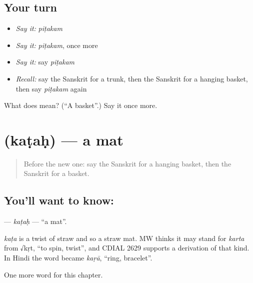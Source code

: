 \subsection*{Your turn}
\begin{itemize}
\raggedright
  \item \emph{Say it:} \emph{piṭakam}
  \item \emph{Say it:} \emph{piṭakam}, once more
  \item \emph{Say it:} say \emph{piṭakam}
  \item \emph{Recall:} say the Sanskrit for a trunk, then the Sanskrit for a hanging basket, then say \emph{piṭakam} again
\end{itemize}

\begin{tcolorbox}[breakable,colback=teal!4,colframe=teal!35!black,title={Before you move on}]
What does  mean? (\textquotedblleft{}A basket\textquotedblright{}.) Say it once more.
\end{tcolorbox}
\section[\texorpdfstring{\sk{कटः} (kaṭaḥ)}{कटः (kaṭaḥ)}]{ (kaṭaḥ) — a mat}

\label{lesson:SA-C189-katah}



\begin{quote}
Before the new one: say the Sanskrit for a hanging basket, then the Sanskrit for a basket.
\end{quote}

\subsection*{You'll want to know: }
\textbf{} — \emph{kaṭaḥ} — \textquotedblleft{}a mat\textquotedblright{}.

\begin{cousinweb}
\emph{kaṭa} is a twist of straw and so a straw mat. MW thinks it may stand for \emph{karta} from √kṛt, \textquotedblleft{}to spin, twist\textquotedblright{}, and CDIAL 2629 supports a derivation of that kind. In Hindi the word became \emph{kaṛā}, \textquotedblleft{}ring, bracelet\textquotedblright{}.
\end{cousinweb}

\begin{grammarlens}[title={What you've built}]
One more word for this chapter.
\end{grammarlens}

